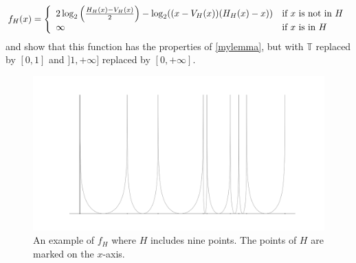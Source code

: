 \documentclass[a4paper,12pt,twoside,BCOR=10mm]{scrbook}
\theoremstyle{definition}
\theoremstyle{definition}
\theoremstyle{definition}
\begin{document}
\[
\label{index29}
	f_H(x) =
	\left \{ 
	\begin{array}{l l}
		2\log_2 \left ( \frac{H_H(x) - V_H(x)}{2} \right ) - \log_2((x - V_H(x))(H_H(x) - x)) & \text{if $x$ is not in $H$}\\
		\infty & \text{if $x$ is in $H$}
	\end{array}
	\right .
\]
and show that this function has the properties of \ref{mylemma}, but with $\mathbb{T}$ replaced by $[0, 1]$ and $]1, +\infty]$ replaced by $[0, +\infty]$.
\begin{figure}[h]
\centering
\includegraphics[width=1\textwidth]{graph8}
\caption{An example of $f_H$ where $H$ includes nine points. The points of $H$ are marked on the $x$-axis. }
\end{figure}
\end{document}
